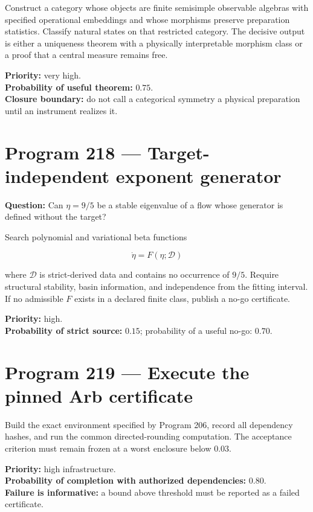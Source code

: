 \documentclass[11pt,a4paper,openany]{report}
\begin{document}
Construct a category whose objects are finite semisimple observable algebras with specified operational embeddings and whose morphisms preserve preparation statistics. Classify natural states on that restricted category. The decisive output is either a uniqueness theorem with a physically interpretable morphism class or a proof that a central measure remains free.

\textbf{Priority:} very high.\\
\textbf{Probability of useful theorem:} \(0.75\).\\
\textbf{Closure boundary:} do not call a categorical symmetry a physical preparation until an instrument realizes it.

\section{Program 218 --- Target-independent exponent generator}

\textbf{Question:} Can \(\eta=9/5\) be a stable eigenvalue of a flow whose generator is defined without the target?

Search polynomial and variational beta functions

\[
\dot\eta=F(\eta;\mathcal D)
\]

where \(\mathcal D\) is strict-derived data and contains no occurrence of \(9/5\). Require structural stability, basin information, and independence from the fitting interval. If no admissible \(F\) exists in a declared finite class, publish a no-go certificate.

\textbf{Priority:} high.\\
\textbf{Probability of strict source:} \(0.15\); probability of a useful no-go: \(0.70\).

\section{Program 219 --- Execute the pinned Arb certificate}

Build the exact environment specified by Program 206, record all dependency hashes, and run the common directed-rounding computation. The acceptance criterion must remain frozen at a worst enclosure below \(0.03\).

\textbf{Priority:} high infrastructure.\\
\textbf{Probability of completion with authorized dependencies:} \(0.80\).\\
\textbf{Failure is informative:} a bound above threshold must be reported as a failed certificate.
\end{document}
